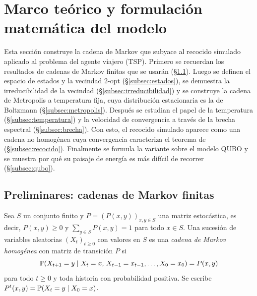 
\section{Marco teórico y formulación matemática del modelo}
\label{sec:marco}

Esta sección construye la cadena de Markov que subyace al recocido
simulado aplicado al problema del agente viajero (TSP). Primero se
recuerdan los resultados de cadenas de Markov finitas que se usarán
(\S\ref{subsec:preliminares}). Luego se definen el espacio de estados y
la vecindad 2-opt (\S\ref{subsec:estados}), se demuestra la
irreducibilidad de la vecindad (\S\ref{subsec:irreducibilidad}) y se
construye la cadena de Metropolis a temperatura fija, cuya distribución
estacionaria es la de Boltzmann (\S\ref{subsec:metropolis}). Después se
estudian el papel de la temperatura (\S\ref{subsec:temperatura}) y la
velocidad de convergencia a través de la brecha espectral
(\S\ref{subsec:brecha}). Con esto, el recocido simulado aparece como
una cadena no homogénea cuya convergencia caracteriza el teorema de
\citet{hajek1988} (\S\ref{subsec:recocido}). Finalmente se formula la
variante sobre el modelo QUBO y se muestra por qué su paisaje de
energía es más difícil de recorrer (\S\ref{subsec:qubo}).

\subsection{Preliminares: cadenas de Markov finitas}
\label{subsec:preliminares}

Sea \(S\) un conjunto finito y \(P=(P(x,y))_{x,y\in S}\) una matriz
estocástica, es decir, \(P(x,y)\ge 0\) y \(\sum_{y\in S}P(x,y)=1\) para
todo \(x\in S\). Una sucesión de variables aleatorias
\((X_t)_{t\ge 0}\) con valores en \(S\) es una \emph{cadena de Markov
homogénea} con matriz de transición \(P\) si
\[
\mathbb{P}(X_{t+1}=y \mid X_t=x,\, X_{t-1}=x_{t-1},\ldots,X_0=x_0)
=P(x,y)
\]
para todo \(t\ge 0\) y toda historia con probabilidad positiva. Se
escribe \(P^t(x,y)=\mathbb{P}(X_t=y\mid X_0=x)\).

